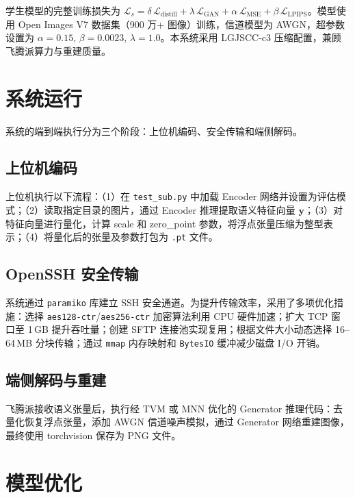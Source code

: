 \documentclass[lang=cn,a4paper,newtx,citestyle=gb7714-2015,bibstyle=gb7714-2015]{elegantpaper}
\begin{document}
学生模型的完整训练损失为 $\mathcal{L}_s = \delta\,\mathcal{L}_{\text{distill}} + \lambda\,\mathcal{L}_{\text{GAN}} + \alpha\,\mathcal{L}_{\text{MSE}} + \beta\,\mathcal{L}_{\text{LPIPS}}$。模型使用 Open Images V7 数据集（900 万+ 图像）训练，信道模型为 AWGN，超参数设置为 $\alpha{=}0.15$, $\beta{=}0.0023$, $\lambda{=}1.0$。本系统采用 LGJSCC-c3 压缩配置，兼顾飞腾派算力与重建质量。

\section{系统运行}

系统的端到端执行分为三个阶段：上位机编码、安全传输和端侧解码。

\subsection{上位机编码}

上位机执行以下流程：（1）在 \texttt{test\_sub.py} 中加载 Encoder 网络并设置为评估模式；（2）读取指定目录的图片，通过 Encoder 推理提取语义特征向量 $\mathbf{y}$；（3）对特征向量进行量化，计算 scale 和 zero\_point 参数，将浮点张量压缩为整型表示；（4）将量化后的张量及参数打包为 \texttt{.pt} 文件。

\subsection{OpenSSH 安全传输}

系统通过 \texttt{paramiko} 库建立 SSH 安全通道。为提升传输效率，采用了多项优化措施：选择 \texttt{aes128-ctr}/\texttt{aes256-ctr} 加密算法利用 CPU 硬件加速；扩大 TCP 窗口至 1\,GB 提升吞吐量；创建 SFTP 连接池实现复用；根据文件大小动态选择 16--64\,MB 分块传输；通过 \texttt{mmap} 内存映射和 \texttt{BytesIO} 缓冲减少磁盘 I/O 开销。

\subsection{端侧解码与重建}

飞腾派接收语义张量后，执行经 TVM 或 MNN 优化的 Generator 推理代码：去量化恢复浮点张量，添加 AWGN 信道噪声模拟，通过 Generator 网络重建图像，最终使用 torchvision 保存为 PNG 文件。

\section{模型优化}
\end{document}
